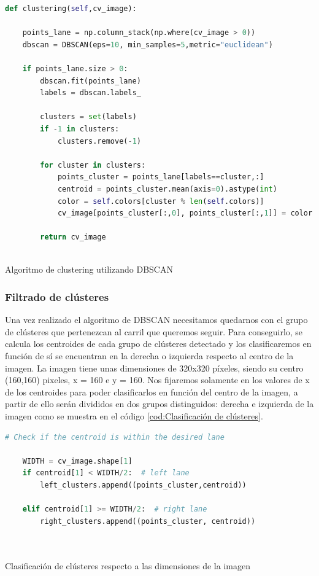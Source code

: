 \begin{code}[h]
  \begin{lstlisting}[language=Python]
    def clustering(self,cv_image):
    
    points_lane = np.column_stack(np.where(cv_image > 0))
    dbscan = DBSCAN(eps=10, min_samples=5,metric="euclidean")

    if points_lane.size > 0:
        dbscan.fit(points_lane)
        labels = dbscan.labels_

        clusters = set(labels)
        if -1 in clusters:
            clusters.remove(-1)
    
        for cluster in clusters:
            points_cluster = points_lane[labels==cluster,:]
            centroid = points_cluster.mean(axis=0).astype(int)
            color = self.colors[cluster % len(self.colors)]
            cv_image[points_cluster[:,0], points_cluster[:,1]] = color

        return cv_image
  
  \end{lstlisting}
  \caption[Algoritmo de custering utilizando DBSCAN]{Algoritmo de clustering utilizando DBSCAN}
  \label{cod:DBSCAN}
  \end{code}  


\subsubsection{Filtrado de clústeres}
\label{clasificación:cluster}
Una vez realizado el algoritmo de DBSCAN necesitamos quedarnos con el grupo de clústeres que pertenezcan al carril que queremos seguir. Para conseguirlo, se calcula los centroides de cada
grupo de clústeres detectado y los clasificaremos en función de sí se encuentran en la derecha o izquierda respecto al centro de la imagen. La imagen tiene unas dimensiones de 320x320 píxeles, 
siendo su centro (160,160) pixeles, x = 160 e y = 160. Nos fijaremos solamente en los valores de x de los centroides para poder clasificarlos en función del centro de la 
imagen, a partir de ello serán divididos en dos grupos distinguidos: derecha e izquierda de la imagen como se muestra en el código \ref{cod:Clasificación de clústeres}. \newline

\begin{code}[h]
  \begin{lstlisting}[language=Python]
    # Check if the centroid is within the desired lane

    WIDTH = cv_image.shape[1]
    if centroid[1] < WIDTH/2:  # left lane
        left_clusters.append((points_cluster,centroid))
       
    elif centroid[1] >= WIDTH/2:  # right lane
        right_clusters.append((points_cluster, centroid))
       
  
  \end{lstlisting}
  \caption[Clasificación de clústeres según las dimensiones de la imagen ]{Clasificación de clústeres respecto a las dimensiones de la imagen}
  \label{cod:Clasificación de clústeres}
  \end{code}  


